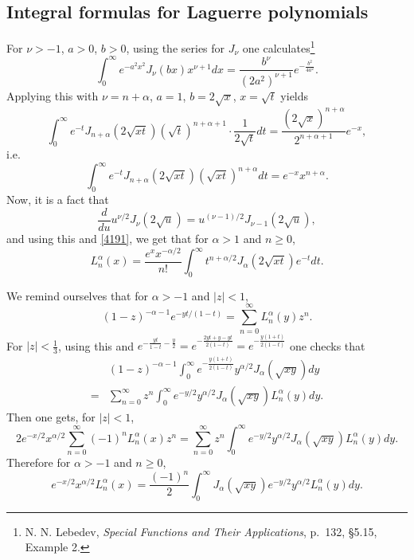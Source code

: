 \documentclass{article}
\theoremstyle{definition}
\begin{document}
\subsection{Integral formulas for Laguerre polynomials}
For $\nu>-1$, $a>0$, $b>0$, using the series for $J_\nu$ one calculates\footnote{N. N. Lebedev,
{\em Special Functions and Their Applications},
p.~132, \S 5.15, Example 2.}
\begin{equation}
\int_0^\infty e^{-a^2x^2} J_\nu(bx)x^{\nu+1} dx=\frac{b^\nu}{(2a^2)^{\nu+1}}e^{-\frac{b^2}{4a^2}}.
\label{5152}
\end{equation}
Applying this with $\nu=n+\alpha$, $a=1$, $b=2\sqrt{x}$, $x=\sqrt{t}$ yields
\[
\int_0^\infty e^{-t} J_{n+\alpha}(2\sqrt{xt}) (\sqrt{t})^{n+\alpha+1} \cdot \frac{1}{2\sqrt{t}} dt
=\frac{(2\sqrt{x})^{n+\alpha}}{2^{n+\alpha+1}} e^{-x},
\]
i.e.
\begin{equation}
\int_0^\infty e^{-t} J_{n+\alpha}(2\sqrt{xt}) (\sqrt{xt})^{n+\alpha} dt = e^{-x} x^{n+\alpha}.
\label{4191}
\end{equation}
Now, it is a fact that
\[
\frac{d}{du} u^{\nu/2} J_\nu(2\sqrt{u}) = u^{(\nu-1)/2} J_{\nu-1}(2\sqrt{u}),
\]
and using this and \eqref{4191}, we get that for $\alpha>1$ and $n \geq 0$,
\begin{equation}
L_n^\alpha(x) = \frac{e^x x^{-\alpha/2}}{n!} \int_0^\infty t^{n+\alpha/2} J_\alpha(2\sqrt{xt}) e^{-t} dt.
\label{4193}
\end{equation}



We remind ourselves that for $\alpha>-1$ and $|z|<1$,
\[
(1-z)^{-\alpha-1} e^{-yt/(1-t)} = \sum_{n=0}^\infty L_n^\alpha(y) z^n.
\]
For $|z|<\frac{1}{3}$, using this 
and $e^{-\frac{yt}{1-t}-\frac{y}{2}} = e^{-\frac{2yt+y-yt}{2(1-t)}}=e^{-\frac{y(1+t)}{2(1-t)}}$
one checks that
\[
\begin{split}
&(1-z)^{-\alpha-1} \int_0^\infty e^{-\frac{y(1+t)}{2(1-t)}} y^{\alpha/2} J_\alpha(\sqrt{xy}) dy\\
=&\sum_{n=0}^\infty z^n \int_0^\infty e^{-y/2} y^{\alpha/2} J_\alpha(\sqrt{xy}) L_n^\alpha(y) dy.
\end{split}
\]
Then one gets, for $|z|<1$,
\[
2e^{-x/2} x^{\alpha/2} \sum_{n=0}^\infty (-1)^n L_n^\alpha(x) z^n = \sum_{n=0}^\infty z^n \int_0^\infty e^{-y/2}
y^{\alpha/2} J_\alpha(\sqrt{xy}) L_n^\alpha(y) dy.
\]
Therefore for $\alpha>-1$ and $n \geq 0$,
\begin{equation}
e^{-x/2} x^{\alpha/2} L_n^\alpha(x) = \frac{(-1)^n}{2} \int_0^\infty J_\alpha(\sqrt{xy}) e^{-y/2} y^{\alpha/2}
L_n^\alpha(y)dy.
\label{4203}
\end{equation}
\end{document}
